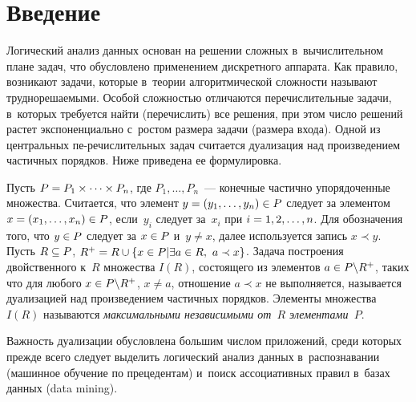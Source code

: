 
  



\thispagestyle{headings}

\begin{multicols}{2}

\label{st\stat}
     
\section{Введение}

    Логический анализ данных основан на решении сложных 
в~вычислительном плане задач, что  обусловлено применением дискретного 
аппарата. Как правило, возникают задачи, которые в~теории алгоритмической 
сложности называют труднорешаемыми. Особой сложностью отличаются 
перечислительные задачи, в~которых требуется найти (перечислить) все 
решения, при этом число решений растет экспоненциально с~рос\-том размера 
задачи (размера входа). Одной из центральных пе-\linebreak речислительных задач 
считается дуализация над произведением частичных порядков. Ниже приведена 
ее формулировка.
    
    Пусть $P\hm= P_1\times \cdots \times P_n$, где $P_1, \ldots , P_n$~--- 
конечные частично упорядоченные множества. Считается, что элемент 
$y\hm=(y_1, \ldots, y_n) \hm \in P$ следует за элементом $x\hm=(x_1, \ldots, 
x_n)\hm\in P$, если~$y_i$ следует за~$x_i$ при $i\hm=1,2, \ldots, n$. Для 
обозначения того, что $y\hm\in P$ следует за $x\hm\in P$ и~$y\not= x$, далее 
используется запись $x\prec y$. Пусть $R\hm\subseteq P$, $R^+\hm= R\cup \{ 
x\hm\in P\vert \exists a\hm\in R,\ a\prec x\}$. Задача построения двойственного 
к~$R$ множества $I(R)$, состоящего из элементов $a\hm\in P\backslash R^+$, 
таких что для любого $x\hm\in P\backslash R^+$, $x\not= a$, отношение $a\prec 
x$ не выполняется, называется дуализацией над произведением частичных 
порядков. Элементы множества~$I(R)$ называются \textit{максимальными 
независимыми от~$R$ элементами~$P$}. 
    
    Важность дуализации обусловлена большим чис\-лом приложений, среди 
которых прежде всего следует выделить логический анализ данных 
в~распознавании (машинное обучение по прецедентам) и~поиск ассоциативных 
правил в~базах данных (data mining).
    

\end{multicols}

